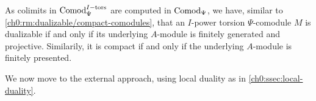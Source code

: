 \begin{remark}
    \label{ch0:rm:dualizable/compact-torsion-comodule}
    As colimits in $\mathrm{Comod}_\Psi^{I-\mathrm{tors}}$ are computed in $\mathrm{Comod}_\Psi$, we have, similar to \cref{ch0:rm:dualizable/compact-comodules}, that an $I$-power torsion $\Psi$-comodule $M$ is dualizable if and only if its underlying $A$-module is finitely generated and projective. Similarily, it is compact if and only if the underlying $A$-module is finitely presented. 
\end{remark}




We now move to the external approach, using local duality as in \cref{ch0:ssec:local-duality}. 

